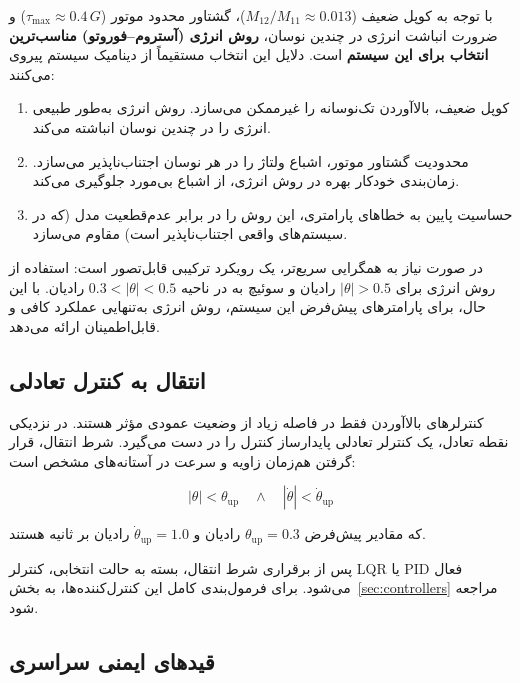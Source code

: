 با توجه به کوپل ضعیف ($M_{12}/M_{11} \approx 0.013$)، گشتاور محدود موتور ($\tau_{\max} \approx 0.4\,G$) و ضرورت انباشت انرژی در چندین نوسان، \textbf{روش انرژی (آستروم–فوروتو) مناسب‌ترین انتخاب برای این سیستم} است. دلایل این انتخاب مستقیماً از دینامیک سیستم پیروی می‌کنند:

\begin{enumerate}
    \item کوپل ضعیف، بالاآوردن تک‌نوسانه را غیرممکن می‌سازد. روش انرژی به‌طور طبیعی انرژی را در چندین نوسان انباشته می‌کند.
    \item محدودیت گشتاور موتور، اشباع ولتاژ را در هر نوسان اجتناب‌ناپذیر می‌سازد. زمان‌بندی خودکار بهره در روش انرژی، از اشباع بی‌مورد جلوگیری می‌کند.
    \item حساسیت پایین به خطاهای پارامتری، این روش را در برابر عدم‌قطعیت مدل (که در سیستم‌های واقعی اجتناب‌ناپذیر است) مقاوم می‌سازد.
\end{enumerate}

در صورت نیاز به همگرایی سریع‌تر، یک رویکرد ترکیبی قابل‌تصور است: استفاده از روش انرژی برای $|\theta| > 0.5$ رادیان و سوئیچ به  در ناحیه $0.3 < |\theta| < 0.5$ رادیان. با این حال، برای پارامترهای پیش‌فرض این سیستم، روش انرژی به‌تنهایی عملکرد کافی و قابل‌اطمینان ارائه می‌دهد.

\subsection{انتقال به کنترل تعادلی}

کنترلرهای بالاآوردن فقط در فاصله زیاد از وضعیت عمودی مؤثر هستند. در نزدیکی نقطه تعادل، یک کنترلر تعادلی پایدارساز کنترل را در دست می‌گیرد. شرط انتقال، قرار گرفتن هم‌زمان زاویه و سرعت در آستانه‌های مشخص است:

\begin{equation}
    |\theta| < \theta_{\text{up}} \quad \wedge \quad |\dot\theta| < \dot\theta_{\text{up}}
\end{equation}

که مقادیر پیش‌فرض $\theta_{\text{up}} = 0.3$ رادیان و $\dot\theta_{\text{up}} = 1.0$ رادیان بر ثانیه هستند.

پس از برقراری شرط انتقال، بسته به حالت انتخابی، کنترلر LQR یا PID فعال می‌شود. برای فرمول‌بندی کامل این کنترل‌کننده‌ها، به بخش~\ref{sec:controllers} مراجعه شود.

\subsection{قیدهای ایمنی سراسری}

